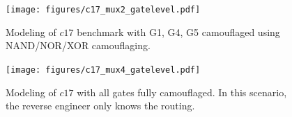 \documentclass[thesis]{umassthesis}  %
\begin{document}

\begin{figure}[!htb] 
\begin{center}
\texttt{[image: figures/c17\_mux2\_gatelevel.pdf]}
\caption{Modeling of $c17$ benchmark with G1, G4, G5 camouflaged using NAND/NOR/XOR camouflaging.}
\label{fig:c17_mux2}
\end{center}
\end{figure}

\begin{figure}[!htb] 
\begin{center}
\texttt{[image: figures/c17\_mux4\_gatelevel.pdf]}
\caption{Modeling of $c17$ with all gates fully camouflaged. In this scenario, the reverse engineer only knows the routing.}
\label{fig:c17_mux4}
\end{center}
\end{figure}
\end{document}
